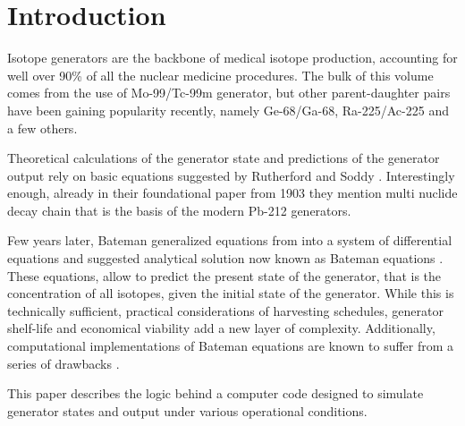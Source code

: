 \section{Introduction}
\label{sec:introduction}

Isotope generators are the backbone of medical isotope production, accounting for well over 90\% of all the nuclear medicine procedures. The bulk of this volume comes from the use of Mo-99/Tc-99m generator, but other parent-daughter pairs have been gaining popularity recently, namely Ge-68/Ga-68, Ra-225/Ac-225 and a few others.

Theoretical calculations of the generator state and predictions of the generator output rely on basic equations suggested by Rutherford and Soddy \cite{rutherford_lx_1903}. Interestingly enough, already in their foundational paper from 1903 they mention multi nuclide decay chain that is the basis of the modern Pb-212 generators.

Few years later, Bateman generalized equations from \cite{rutherford_lx_1903} into a system of differential equations and suggested analytical solution now known as Bateman equations \cite{bateman_solution_1908}. These equations, allow to predict the present state of the generator, that is the concentration of all isotopes, given the initial state of the generator. While this is technically sufficient, practical considerations of harvesting schedules, generator shelf-life and economical viability add a new layer of complexity. Additionally, computational implementations of Bateman equations are known to suffer from a series of drawbacks \cite{bakin_computational_2018}.

This paper describes the logic behind a computer code designed to simulate generator states and output under various operational conditions. 

